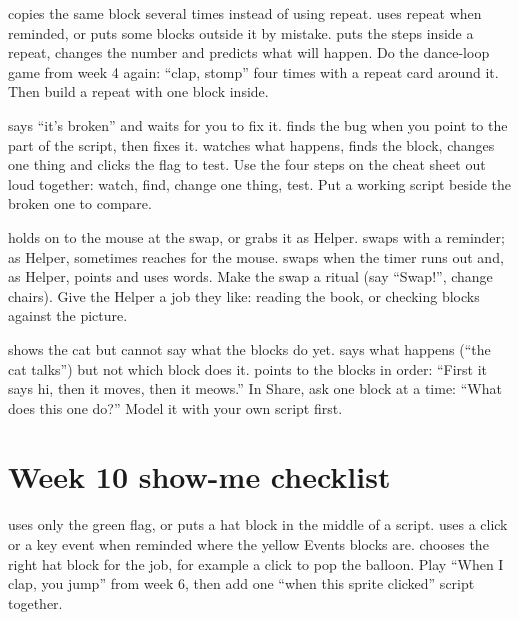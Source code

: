   {copies the same block several times instead of using repeat.}
  {uses repeat when reminded, or puts some blocks outside it by mistake.}
  {puts the steps inside a repeat, changes the number and predicts what will happen.}
  {Do the dance-loop game from week 4 again: \enquote{clap, stomp} four times with a repeat card around it. Then build a repeat with one block inside.}

  {says \enquote{it's broken} and waits for you to fix it.}
  {finds the bug when you point to the part of the script, then fixes it.}
  {watches what happens, finds the block, changes one thing and clicks the flag to test.}
  {Use the four steps on the cheat sheet out loud together: watch, find, change one thing, test. Put a working script beside the broken one to compare.}

  {holds on to the mouse at the swap, or grabs it as Helper.}
  {swaps with a reminder; as Helper, sometimes reaches for the mouse.}
  {swaps when the timer runs out and, as Helper, points and uses words.}
  {Make the swap a ritual (say \enquote{Swap!}, change chairs). Give the Helper a job they like: reading the book, or checking blocks against the picture.}

  {shows the cat but cannot say what the blocks do yet.}
  {says what happens (\enquote{the cat talks}) but not which block does it.}
  {points to the blocks in order: \enquote{First it says hi, then it moves, then it meows.}}
  {In Share, ask one block at a time: \enquote{What does this one do?} Model it with your own script first.}

\section{Week 10 show-me checklist}

  {uses only the green flag, or puts a hat block in the middle of a script.}
  {uses a click or a key event when reminded where the yellow Events blocks are.}
  {chooses the right hat block for the job, for example a click to pop the balloon.}
  {Play \enquote{When I clap, you jump} from week 6, then add one \enquote{when this sprite clicked} script together.}

